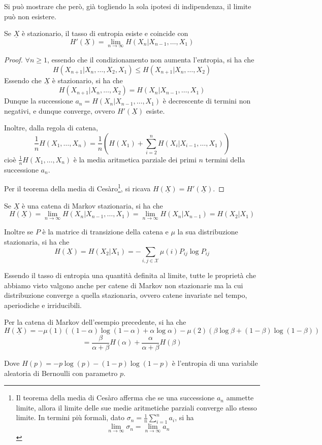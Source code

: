 Si può mostrare che però, già togliendo la sola ipotesi di indipendenza, il limite può non esistere.

\begin{theorem}{}
  Se \(\underline{X}\) è stazionario, il tasso di entropia esiste e coincide con
  \[H'(\underline{X}) = \lim_{n\to\infty} H(X_n|X_{n-1}, \ldots, X_1)\]
\end{theorem}

\begin{proof}
  \(\forall n \geq 1\), essendo che il condizionamento non aumenta l'entropia, si ha che
  \[H(X_{n+1}|X_n, \ldots,X_2, X_1)\leq H(X_{n+1}|X_n, \ldots, X_2)\]
  Essendo che \(\underline{X}\) è stazionario, si ha che
  \[H(X_{n+1}|X_n, \ldots, X_2) = H(X_n|X_{n-1}, \ldots, X_1)\]
  Dunque la successione \(a_n = H(X_n|X_{n-1}, \ldots, X_1)\) è decrescente di termini non negativi, e dunque converge, ovvero \(H'(\underline{X})\) esiste.

  Inoltre, dalla regola di catena,
  \[\frac{1}{n} H(X_1, \ldots, X_n) = \frac{1}{n}\left(H(X_1) +\sum_{i=2}^n H(X_i|X_{i-1}, \ldots, X_1)\right)\]
  cioè \(\frac{1}{n} H(X_1, \ldots, X_n)\) è la media aritmetica parziale dei primi \(n\) termini della successione \(a_n\).

  Per il teorema della media di Cesàro\footnote{Il teorema della media di Cesàro afferma che se una successione \(a_n\) ammette limite, allora il limite delle sue medie aritmetiche parziali converge allo stesso limite. In termini più formali, dato \(\sigma_n = \frac{1}{n}\sum_{i=1}^n a_i\), si ha \[\lim_{n\to\infty} \sigma_n = \lim_{n\to\infty} a_n\]}, si ricava \(H(\underline{X}) = H'(\underline{X})\).
\end{proof}

Se \(\underline{X}\) è una catena di Markov stazionaria, si ha che
\[H(\underline{X}) = \lim_{n\to\infty}H(X_n|X_{n-1}, \ldots, X_1) = \lim_{n\to\infty} H(X_n|X_{n-1}) = H(X_2|X_1)\]

Inoltre se \(P\) è la matrice di transizione della catena e \(\mu\) la sua distribuzione stazionaria, si ha che
\[H(\underline{X}) = H(X_2|X_1) = -\sum_{i,j\in \mathcal{X}} \mu(i) P_{ij} \log P_{ij}\]

Essendo il tasso di entropia una quantità definita al limite, tutte le proprietà che abbiamo visto valgono anche per catene di Markov non stazionarie ma la cui distribuzione converge a quella stazionaria, ovvero catene invariate nel tempo, aperiodiche e irriducibili.

\begin{example}{}
  Per la catena di Markov dell'esempio precedente, si ha che
  \[H(\underline{X}) = -\mu(1)((1-\alpha)\log(1-\alpha) + \alpha \log \alpha) - \mu(2)(\beta \log \beta + (1-\beta) \log (1-\beta))\]
  \[=\frac{\beta}{\alpha+\beta} H(\alpha) + \frac{\alpha}{\alpha+\beta} H(\beta)\]

  Dove \(H(p) = -p \log(p) - (1-p) \log (1-p)\) è l'entropia di una variabile aleatoria di Bernoulli con parametro \(p\).
\end{example}


